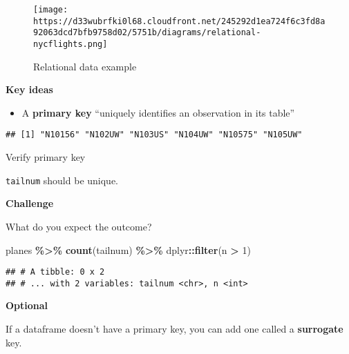 \documentclass[
]{book}
\newenvironment{Shaded}{\begin{snugshade}}{\end{snugshade}}
\newcommand{\CommentTok}[1]{\textcolor[rgb]{0.56,0.35,0.01}{\textit{#1}}}
\newcommand{\DecValTok}[1]{\textcolor[rgb]{0.00,0.00,0.81}{#1}}
\newcommand{\KeywordTok}[1]{\textcolor[rgb]{0.13,0.29,0.53}{\textbf{#1}}}
\newcommand{\NormalTok}[1]{#1}
\newcommand{\OperatorTok}[1]{\textcolor[rgb]{0.81,0.36,0.00}{\textbf{#1}}}
\newcommand{\StringTok}[1]{\textcolor[rgb]{0.31,0.60,0.02}{#1}}
\providecommand{\tightlist}{%
  \setlength{\itemsep}{0pt}\setlength{\parskip}{0pt}}
\begin{document}
\begin{figure}
\centering
\texttt{[image: https://d33wubrfki0l68.cloudfront.net/245292d1ea724f6c3fd8a92063dcd7bfb9758d02/5751b/diagrams/relational-nycflights.png]}
\caption{Relational data example}
\end{figure}

\textbf{Key ideas}

\begin{itemize}
\tightlist
\item
  A \textbf{primary key} ``uniquely identifies an observation in its table''
\end{itemize}

\begin{Shaded}
\end{Shaded}

\begin{verbatim}
## [1] "N10156" "N102UW" "N103US" "N104UW" "N10575" "N105UW"
\end{verbatim}

Verify primary key

\texttt{tailnum} should be unique.

\textbf{Challenge}

What do you expect the outcome?

\begin{Shaded}
\begin{Highlighting}[]
\NormalTok{planes }\OperatorTok{\%\textgreater{}\%}
\StringTok{  }\KeywordTok{count}\NormalTok{(tailnum) }\OperatorTok{\%\textgreater{}\%}
\StringTok{  }\NormalTok{dplyr}\OperatorTok{::}\KeywordTok{filter}\NormalTok{(n }\OperatorTok{\textgreater{}}\StringTok{ }\DecValTok{1}\NormalTok{)}
\end{Highlighting}
\end{Shaded}

\begin{verbatim}
## # A tibble: 0 x 2
## # ... with 2 variables: tailnum <chr>, n <int>
\end{verbatim}

\textbf{Optional}

If a dataframe doesn't have a primary key, you can add one called a \textbf{surrogate} key.
\end{document}
